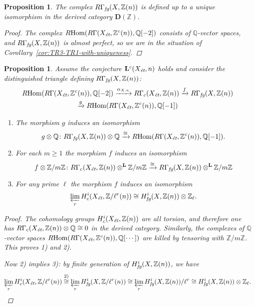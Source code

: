 \documentclass[leqno,12pt]{article}
\theoremstyle{plain}
\newtheorem{proposition}[theorem]{\indent\sc Proposition}
\theoremstyle{definition}
\DeclareMathOperator{\Hom}{Hom}
\newcommand{\QQ}{\mathbb{Q}}
\newcommand{\ZZ}{\mathbb{Z}}
\newcommand{\et}{\text{\it \'{e}t}}
\newcommand{\fg}{\text{\it fg}}
\newcommand{\RHom}{R\!\Hom}
\newcommand{\DZ}{{\mathbf{D} (\ZZ)}}
\begin{document}
\begin{proposition}
  \label{prop:RGamma-fg-well-defined}
  The complex $R\Gamma_\fg (X, \ZZ (n))$ is defined up to a unique isomorphism
  in the derived category $\DZ$.

  \begin{proof}
    The complex $\RHom (R\Gamma (X_\et, \ZZ^c (n)), \QQ [-2])$ consists of
    $\QQ$-vector spaces, and $R\Gamma_\fg (X, \ZZ (n))$ is almost perfect, so we
    are in the situation of Corollary~\ref{cor:TR3-TR1-with-uniqueness}.
  \end{proof}
\end{proposition}

\begin{proposition}
  \label{prop:tensoring-RGammafg-with-Z/m-and-Q}
  Assume the conjecture $\mathbf{L}^c (X_\et,n)$ holds and consider the
  distinguished triangle defining $R\Gamma_\fg (X, \ZZ (n))$:
  \begin{multline*}
    \RHom (R\Gamma (X_\et, \ZZ^c (n)), \QQ [-2]) \xrightarrow{\alpha_{X,n}}
    R\Gamma_c (X_\et, \ZZ (n)) \xrightarrow{f}
    R\Gamma_\fg (X, \ZZ (n)) \\
    \xrightarrow{g} \RHom (R\Gamma (X_\et, \ZZ^c (n)), \QQ [-1])
  \end{multline*}

  \begin{enumerate}
  \item[$1)$] The morphism $g$ induces an isomorphism
    \[ g\otimes \QQ\colon R\Gamma_\fg (X, \ZZ (n)) \otimes \QQ \xrightarrow{\cong}
      \RHom (R\Gamma (X_\et, \ZZ^c (n)), \QQ [-1]).\]

  \item[$2)$] For each $m \ge 1$ the morphism $f$ induces an
    isomorphism
    \[ f\otimes \ZZ/m\ZZ\colon
      R\Gamma_c (X_\et, \ZZ (n))\otimes^\mathbf{L} \ZZ/m\ZZ \xrightarrow{\cong}
      R\Gamma_\fg (X, \ZZ (n))\otimes^\mathbf{L} \ZZ/m\ZZ \]
    
  \item[$3)$] For any prime $\ell$ the morphism $f$ induces an isomorphism
    $$\varprojlim_r H_c^i (X_\et, \ZZ/\ell^r (n)) \cong H_\fg^i (X, \ZZ (n)) \otimes \ZZ_\ell.$$
  \end{enumerate}
  
  \begin{proof}
    The cohomology groups $H_c^i (X_\et, \ZZ (n))$ are all torsion, and
    therefore one has $R\Gamma_c (X_\et, \ZZ (n)) \otimes \QQ \cong 0$ in
    the derived category. Similarly, the complexes of $\QQ$-vector spaces
    $\RHom (R\Gamma (X_\et, \ZZ^c (n)), \QQ [\cdots])$ are killed by tensoring
    with $\ZZ/m\ZZ$.  This proves 1) and 2).

    Now 2) implies 3): by finite generation of $H_\fg^i (X, \ZZ (n))$, we have
    \[ \varprojlim_r H_c^i (X_\et, \ZZ/\ell^r (n)) \stackrel{\text{2)}}{\cong}
      \varprojlim_r H_\fg^i (X, \ZZ/\ell^r (n)) \cong
      \varprojlim_r H_\fg^i (X, \ZZ (n))/\ell^r \cong
      H_\fg^i (X, \ZZ (n)) \otimes \ZZ_\ell. \qedhere \]
  \end{proof}
\end{proposition}
\end{document}
